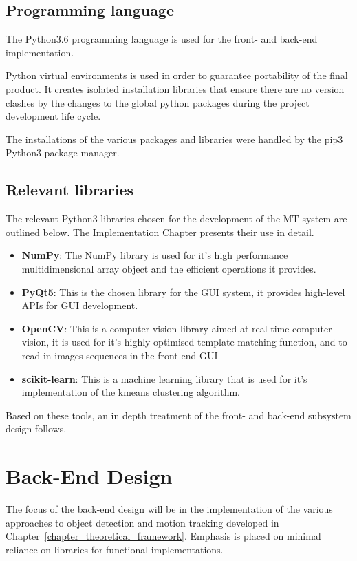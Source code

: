 \subsection{Programming language}
The Python3.6 programming language is used for the front- and
back-end implementation.

Python virtual environments is used in order to guarantee portability of the
final product. It creates isolated installation libraries that ensure there are
no version clashes by the changes to the global python packages during the
project development life cycle.

The installations of the various packages and libraries were handled by the pip3
Python3 package manager.

\subsection{Relevant libraries}
The relevant Python3 libraries chosen for the development of the MT system are
outlined below. The Implementation Chapter presents their use in detail.
\begin{itemize}
    \item \textbf{NumPy}: The NumPy library is used for it's high performance
        multidimensional array object and the efficient operations it provides.
    \item \textbf{PyQt5}: This is the chosen library for the GUI system, it
        provides high-level APIs for GUI development.     
    \item \textbf{OpenCV}: This is a computer vision library aimed at
        real-time computer vision, it is used for it's highly optimised template
        matching function, and to read in images sequences in the front-end GUI
    \item \textbf{scikit-learn}: This is a machine learning library that is
        used for it's implementation of the kmeans clustering algorithm.
\end{itemize}

Based on these tools, an in depth treatment of the front- and back-end subsystem
design follows. 

\section{Back-End Design}\label{design_back_end}
The focus of the back-end design will be in the implementation of the various
approaches to object detection and motion tracking developed in
Chapter~\ref{chapter_theoretical_framework}.
Emphasis is placed on minimal reliance on libraries for functional
implementations.

